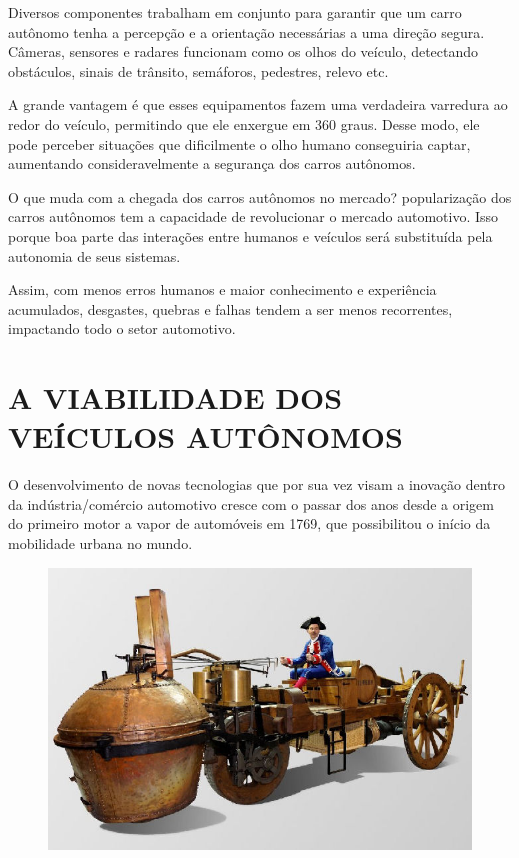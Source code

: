 \documentclass[a4paper, 12pt]{article}
\begin{document}
    Diversos componentes trabalham em conjunto para garantir que um carro autônomo tenha a percepção e a orientação necessárias a uma direção segura. Câmeras, sensores e radares funcionam como os olhos do veículo, detectando obstáculos, sinais de trânsito, semáforos, pedestres, relevo etc.

    A grande vantagem é que esses equipamentos fazem uma verdadeira varredura ao redor do veículo, permitindo que ele enxergue em 360 graus. Desse modo, ele pode perceber situações que dificilmente o olho humano conseguiria captar, aumentando consideravelmente a segurança dos carros autônomos.
    
    O que muda com a chegada dos carros autônomos no mercado? popularização dos carros autônomos tem a capacidade de revolucionar o mercado automotivo. Isso porque boa parte das interações entre humanos e veículos será substituída pela autonomia de seus sistemas. 

    Assim, com menos erros humanos e maior conhecimento e experiência acumulados, desgastes, quebras e falhas tendem a ser menos recorrentes, impactando todo o setor automotivo.
     \newpage
    \section{A VIABILIDADE DOS VEÍCULOS AUTÔNOMOS}
    
     O desenvolvimento de novas tecnologias que por sua vez visam a inovação dentro da indústria/comércio automotivo cresce com o passar dos anos desde a origem do primeiro motor a vapor de automóveis em 1769, que possibilitou o início da mobilidade urbana no mundo.
     
    \begin{figure}[htb]
        \centering
        \includegraphics[scale=0.5]{0004.png}
        \label{fig:my_label}
    \end{figure}
    
\end{document}
